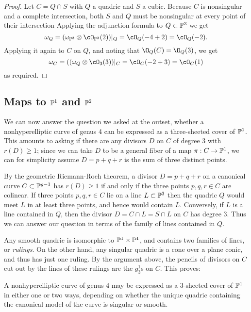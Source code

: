 \begin{proof}
Let $C = Q\cap S$ with $Q$ a quadric and $S$ a cubic. Because $C$ is nonsingular and a complete intersection, both $S$ and $Q$ must be nonsingular at every point of their intersection Applying the adjunction formula to $Q\subset \PP^3$ we get
$$
\omega_Q = (\omega_{\PP^3} \otimes \cO_{\PP^3}(2))|_Q = \cO_Q(-4+2) = \cO_Q(-2).
$$
Applying it again to $C$ on $Q$, and noting that $\O_Q(C) = \O_Q(3)$, we get
$$
\omega_C = ((\omega_{Q} \otimes \cO_{3}(3))|_C = \cO_C(-2+3) = \cO_C(1)
$$
as required. 
\end{proof}

\subsection{Maps to $\PP^1$ and $\PP^2$}

We can now answer the question we asked at the outset, whether a nonhyperelliptic curve of genus 4 can be expressed as a three-sheeted cover of $\PP^1$. This amounts to asking if there are any divisors $D$ on $C$ of degree 3 with $r(D) \geq 1$; since we can take $D$ to be a general fiber of a map $\pi : C \to \PP^1$, we can for simplicity assume $D = p+q+r$ is the sum of three distinct points.

By the geometric Riemann-Roch theorem, a divisor $D = p+q+r$ on a canonical curve $C \subset \PP^{g-1}$ has $r(D) \geq 1$ if and only if the three points $p,q,r \in C$ are colinear. If three points $p,q,r \in C$ lie on a line $L \subset \PP^3$ then the quadric $Q$ would meet $L$ in at least three points, and hence would contain $L$. Conversely,  if $L$ is a line contained in $Q$, then the divisor $D = C \cap L = S \cap L$ on $C$ has degree  3. Thus we can answer our question in terms of the family of lines contained in $Q$.

Any smooth quadric is isomorphic to $\PP^1\times \PP^1$, and contains two families of lines, or \emph{rulings}. On the other hand, any singular quadric is a cone over a plane conic, and thus has just one ruling. By the argument above, the pencils of divisors on $C$ cut out by the lines of these rulings are the $g^1_3$s on $C$. This proves:

\begin{proposition}\label{genus 4 trigonal}
A nonhyperelliptic curve of genus 4 may be expressed as a 3-sheeted cover of $\PP^1$ in either one or two ways, depending on whether the unique quadric containing the canonical model of the curve is singular or smooth.
\end{proposition}

